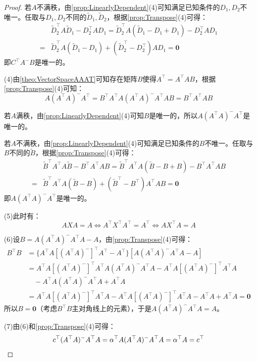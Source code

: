 \begin{proof}
	若$A$不满秩，由\cref{prop:LinearlyDependent}(4)可知满足已知条件的$D_1,D_2$不唯一。任取与$D_1,D_2$不同的$\tilde{D}_1,\tilde{D}_2$，根据\cref{prop:Transpose}(4)可得：
	\begin{align*}
		&\tilde{D}_2^{\top}A\tilde{D}_1-D_2^{\top}AD_1=\tilde{D}_2^{\top}A(\tilde{D}_1-D_1+D_1)-D_2^{\top}AD_1 \\
		=&\tilde{D}_2^{\top}A(\tilde{D}_1-D_1)+(\tilde{D}_2^{\top}-D_2^{\top})AD_1=\mathbf{0}
	\end{align*}
	即$C^{\top}A^-B$是唯一的。\par
	(4)由\cref{theo:VectorSpaceAAAT}可知存在矩阵$B$使得$A^{\top}=A^{\top}AB$，根据\cref{prop:Transpose}(4)可知：
	\begin{equation*}
		A(A^{\top}A)^{-}A^{\top}=B^{\top}A^{\top}A(A^{\top}A)^{-}A^{\top}AB=B^{\top}A^{\top}AB
	\end{equation*}\par
	若$A$满秩，由\cref{prop:LinearlyDependent}(4)可知$B$是唯一的，所以$A(A^{\top}A)^{-}A^{\top}$是唯一的。\par
	若$A$不满秩，由\cref{prop:LinearlyDependent}(4)可知满足已知条件的$B$不唯一。任取与$B$不同的$\tilde{B}$，根据\cref{prop:Transpose}(4)可得：
	\begin{align*}
		&\tilde{B}^{\top}A^{\top}A\tilde{B}-B^{\top}A^{\top}AB=\tilde{B}^{\top}A^{\top}A(\tilde{B}-B+B)-B^{\top}A^{\top}AB \\
		=&\tilde{B}^{\top}A^{\top}A(\tilde{B}-B)+(\tilde{B}^{\top}-B^{\top})A^{\top}AB=\mathbf{0}
	\end{align*}
	即$A(A^{\top}A)^{-}A^{\top}$是唯一的。\par
	(5)此时有：
	\begin{equation*}
		AXA=A\iff A^{\top}X^{\top}A^{\top}=A^{\top}\iff AX^{\top}A=A
	\end{equation*}\par
	(6)设$B=A(A^{\top}A)^-A^{\top}A-A$，由\cref{prop:Transpose}(4)可得：
	\begin{align*}
		B^{\top}B
		&=\{A^{\top}A[(A^{\top}A)^-]^{\top}A^{\top}-A^{\top}\}[A(A^{\top}A)^-A^{\top}A-A] \\
		&=A^{\top}A[(A^{\top}A)^-]^{\top}A^{\top}A(A^{\top}A)^-A^{\top}A-A^{\top}A[(A^{\top}A)^-]^{\top}A^{\top}A \\
		&\quad-A^{\top}A(A^{\top}A)^-A^{\top}A+A^{\top}A \\
		&=A^{\top}A[(A^{\top}A)^-]^{\top}A^{\top}A-A^{\top}A[(A^{\top}A)^-]^{\top}A^{\top}A-A^{\top}A+A^{\top}A=\mathbf{0}
	\end{align*}
	所以$B=\mathbf{0}$（考虑$B^{\top}B$主对角线上的元素），于是$A(A^{\top}A)^-A^{\top}A=A$。\par
	(7)由(6)和\cref{prop:Transpose}(4)可得：
	\begin{equation*}
		c^{\top}(A^{\top}A)^-A^{\top}A=\alpha^{\top}A(A^{\top}A)^-A^{\top}A=\alpha^{\top}A=c^{\top}\qedhere
	\end{equation*}
\end{proof}

